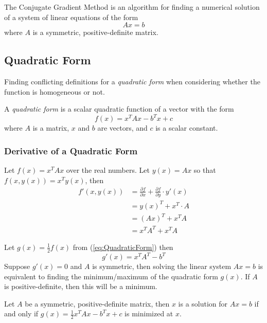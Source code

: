 \documentclass[../main.tex]{subfiles}
\begin{document}
The Conjugate Gradient Method is an algorithm for finding a numerical solution of a system of linear equations of the form
\begin{equation}
Ax=b
\end{equation}
where $A$ is a symmetric, positive-definite matrix.

\subsection{Quadratic Form}
\color{red} Finding conflicting definitions for a \textit{quadratic form} when considering whether the function is homogeneous or not.\color{black}

\begin{definition}
A \textit{quadratic form} is a scalar quadratic function of a vector with the form
\begin{equation}\label{eq:QuadraticForm}
f(x) = x^TAx-b^Tx+c
\end{equation}
where $A$ is a matrix, $x$ and $b$ are vectors, and $c$ is a scalar constant.
\end{definition}

\subsubsection{Derivative of a Quadratic Form}\label{section:DerivativeQuadraticForm}
Let $f(x) = x^TAx$ over the real numbers. Let $y(x) = Ax$ so that $f(x,y(x)) =  x^Ty(x)$, then
\begin{align*}
f'(x,y(x)) 	&= \frac{\partial f}{\partial x} + \frac{\partial f}{\partial y} \cdot y'(x)\\
			&= y(x)^T + x^T\cdot A\\
            &= (Ax)^T + x^TA\\
            &= x^TA^T + x^TA
\end{align*}

Let $g(x) = \frac{1}{2}f(x)$ from (\ref{eq:QuadraticForm}) then
\begin{equation}\label{eq:DirevativeQuadraticForm}
g'(x) = x^TA^T-b^T
\end{equation}
Suppose $g'(x) = 0$ and $A$ is symmetric, then solving the linear system $Ax=b$ is equivalent to finding the minimum/maximum of the quadratic form $g(x)$. If $A$ is positive-definite, then this will be a minimum.
\begin{claim}
Let $A$ be a symmetric, positive-definite matrix, then $x$ is a solution for $Ax=b$ if and only if $g(x) = \frac{1}{2}x^TAx-b^Tx+c$ is minimized at $x$.
\end{claim}
\end{document}
